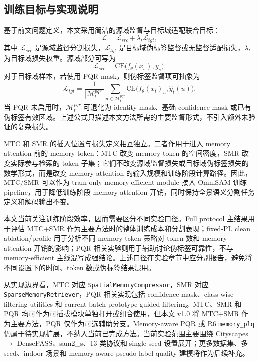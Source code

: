 \subsection{训练目标与实现说明}
基于前文问题定义，本文采用简洁的源域监督与目标域适配联合目标：
\[
\mathcal{L}
=
\mathcal{L}_{src}
+
\lambda_t \mathcal{L}_{tgt},
\]
其中 $\mathcal{L}_{src}$ 是源域监督分割损失，$\mathcal{L}_{tgt}$ 是目标域伪标签监督或无监督适配损失，$\lambda_t$ 为目标域损失权重。源域部分可写为
\[
\mathcal{L}_{src}
=
\mathrm{CE}\big(f_{\theta}(x_s), y_s\big).
\]
对于目标域样本，若使用 PQR mask，则伪标签监督项可抽象为
\[
\mathcal{L}_{tgt}
=
\frac{1}{|\mathcal{M}^{pqr}_t|}
\sum_{u \in \mathcal{M}^{pqr}_t}
\mathrm{CE}\big(f_{\theta}(x_t)_u, \hat{y}_t(u)\big).
\]
当 PQR 未启用时，$\mathcal{M}^{pqr}_t$ 可退化为 identity mask、基础 confidence mask 或已有伪标签有效区域。上述公式只描述本文方法所需的主要监督形式，不引入额外未验证的复杂损失。

MTC 和 SMR 的插入位置与损失定义相互独立。二者作用于进入 memory attention 前的 memory token：MTC 改变 memory token 的空间密度，SMR 改变实际参与检索的 token 子集；它们不改变源域监督损失或目标域伪标签损失的数学形式，而是改变 memory attention 的输入规模和训练阶段计算路径。因此，MTC/SMR 可以作为 train-only memory-efficient module 接入 OmniSAM 训练 pipeline，用于降低训练阶段 memory attention 开销，同时保持全景语义分割任务定义和解码输出不变。

本文当前关注训练阶段效率，因而需要区分不同实验口径。Full protocol 主结果用于评估 MTC+SMR 作为主要方法时的整体训练成本和分割表现；fixed-PL clean ablation/profile 用于分析不同 memory token 策略对 token 数和 memory attention 开销的影响；PQR 相关实验则用于辅助讨论伪标签可靠性，不与 memory-efficient 主线混写成强结论。上述口径在实验章节中应分别报告，避免将不同设置下的时间、token 数或伪标签结果混用。

从实现边界看，MTC 对应 \texttt{SpatialMemoryCompressor}，SMR 对应 \texttt{SparseMemoryRetriever}，PQR 相关实现包括 confidence mask、class-wise filtering utilities 和 current-batch prototype-guided filtering。MTC、SMR 和 PQR 均可作为可插拔模块单独打开或组合使用，但本文 v1.0 将 MTC+SMR 作为主要方法，PQR 仅作为可选辅助分支。Memory-aware PQR 或 R6 \texttt{memory\_plq} 仍属于待实现扩展，不纳入当前已完成方法。当前实验范围主要围绕 Cityscapes $\rightarrow$ DensePASS、sam2\_s、13 类协议和 single seed 设置展开；更多数据集、多 seed、indoor 场景和 memory-aware pseudo-label quality 建模将作为后续补充。
